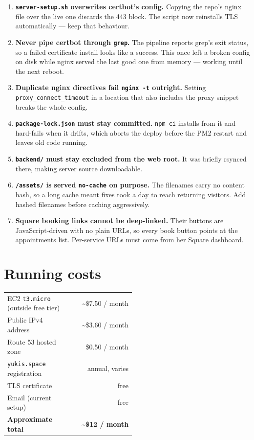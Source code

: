 \documentclass[11pt,a4paper]{article}
\newcommand{\lead}[1]{\textbf{\color{ink}#1}}
\newcommand{\code}[1]{\texttt{\small #1}}
\begin{document}
\begin{enumerate}
  \item \lead{\code{server-setup.sh} overwrites certbot's config.} Copying the
        repo's nginx file over the live one discards the 443 block. The script
        now reinstalls TLS automatically --- keep that behaviour.
  \item \lead{Never pipe certbot through \code{grep}.} The pipeline reports
        grep's exit status, so a failed certificate install looks like a
        success. This once left a broken config on disk while nginx served the
        last good one from memory --- working until the next reboot.
  \item \lead{Duplicate nginx directives fail \code{nginx -t} outright.}
        Setting \code{proxy\_connect\_timeout} in a location that also
        includes the proxy snippet breaks the whole config.
  \item \lead{\code{package-lock.json} must stay committed.} \code{npm ci}
        installs from it and hard-fails when it drifts, which aborts the
        deploy before the PM2 restart and leaves old code running.
  \item \lead{\code{backend/} must stay excluded from the web root.} It was
        briefly rsynced there, making server source downloadable.
  \item \lead{\code{/assets/} is served \code{no-cache} on purpose.} The
        filenames carry no content hash, so a long cache meant fixes took a
        day to reach returning visitors. Add hashed filenames before caching
        aggressively.
  \item \lead{Square booking links cannot be deep-linked.} Their buttons are
        JavaScript-driven with no plain URLs, so every book button points at
        the appointments list. Per-service URLs must come from her Square
        dashboard.
\end{enumerate}

\section{Running costs}

\begin{longtable}{@{}p{0.52\linewidth}r@{}}
\toprule
EC2 \code{t3.micro} (outside free tier) & \textasciitilde\$7.50 / month \\
Public IPv4 address                     & \textasciitilde\$3.60 / month \\
Route 53 hosted zone                    & \$0.50 / month \\
\code{yukis.space} registration         & annual, varies \\
TLS certificate                         & free \\
Email (current setup)                   & free \\
\midrule
\textbf{Approximate total}              & \textbf{\textasciitilde\$12 / month} \\
\bottomrule
\end{longtable}
\end{document}
